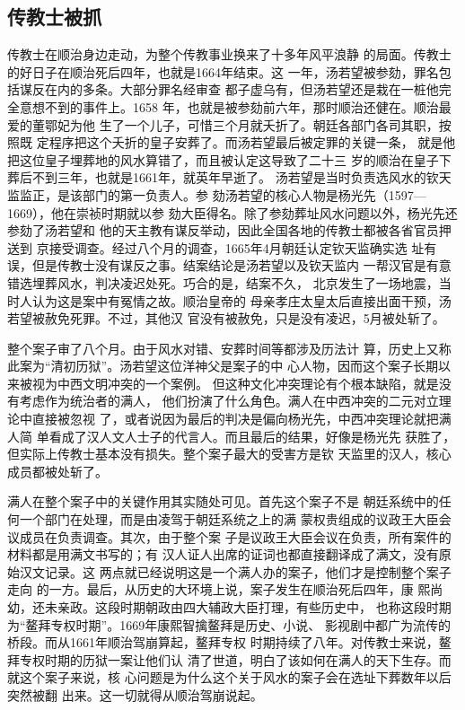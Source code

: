 \subsection{传教士被抓}
\par
传教士在顺治身边走动，为整个传教事业换来了十多年风平浪静%
的局面。传教士的好日子在顺治死后四年，也就是1664年结束。这%
一年，汤若望被参劾，罪名包括谋反在内的多条。大部分罪名经审查%
都子虚乌有，但汤若望还是栽在一桩他完全意想不到的事件上。1658%
年，也就是被参劾前六年，那时顺治还健在。顺治最爱的董鄂妃为他%
生了一个儿子，可惜三个月就夭折了。朝廷各部门各司其职，按照既%
定程序把这个夭折的皇子安葬了。而汤若望最后被定罪的关键一条，%
就是他把这位皇子埋葬地的风水算错了，而且被认定这导致了二十三%
岁的顺治在皇子下葬后不到三年，也就是1661年，就英年早逝了。%
汤若望是当时负责选风水的钦天监监正，是该部门的第一负责人。参%
劾汤若望的核心人物是杨光先（1597—1669），他在崇祯时期就以参%
劾大臣得名。除了参劾葬址风水问题以外，杨光先还参劾了汤若望和%
他的天主教有谋反举动，因此全国各地的传教士都被各省官员押送到%
京接受调查。经过八个月的调查，1665年4月朝廷认定钦天监确实选%
址有误，但是传教士没有谋反之事。结案结论是汤若望以及钦天监内%
一帮汉官是有意错选埋葬风水，判决凌迟处死。巧合的是，结案不久，%
北京发生了一场地震，当时人认为这是案中有冤情之故。顺治皇帝的%
母亲孝庄太皇太后直接出面干预，汤若望被赦免死罪。不过，其他汉%
官没有被赦免，只是没有凌迟，5月被处斩了。%
\par
整个案子审了八个月。由于风水对错、安葬时间等都涉及历法计%
算，历史上又称此案为“清初历狱”。汤若望这位洋神父是案子的中%
心人物，因而这个案子长期以来被视为中西文明冲突的一个案例。%
但这种文化冲突理论有个根本缺陷，就是没有考虑作为统治者的满人，%
他们扮演了什么角色。满人在中西冲突的二元对立理论中直接被忽视%
了，或者说因为最后的判决是偏向杨光先，中西冲突理论就把满人简%
单看成了汉人文人士子的代言人。而且最后的结果，好像是杨光先%
获胜了，但实际上传教士基本没有损失。整个案子最大的受害方是钦%
天监里的汉人，核心成员都被处斩了。%
\par
满人在整个案子中的关键作用其实随处可见。首先这个案子不是%
朝廷系统中的任何一个部门在处理，而是由凌驾于朝廷系统之上的满%
蒙权贵组成的议政王大臣会议成员在负责调查。其次，由于整个案%
子是议政王大臣会议在负责，所有案件的材料都是用满文书写的；有%
汉人证人出席的证词也都直接翻译成了满文，没有原始汉文记录。这%
两点就已经说明这是一个满人办的案子，他们才是控制整个案子走向%
的一方。最后，从历史的大环境上说，案子发生在顺治死后四年，康%
熙尚幼，还未亲政。这段时期朝政由四大辅政大臣打理，有些历史中，%
也称这段时期为“鳌拜专权时期”。1669年康熙智擒鳌拜是历史、小说、%
影视剧中都广为流传的桥段。而从1661年顺治驾崩算起，鳌拜专权%
时期持续了八年。对传教士来说，鳌拜专权时期的历狱一案让他们认%
清了世道，明白了该如何在满人的天下生存。而就这个案子来说，核%
心问题是为什么这个关于风水的案子会在选址下葬数年以后突然被翻%
出来。这一切就得从顺治驾崩说起。%
